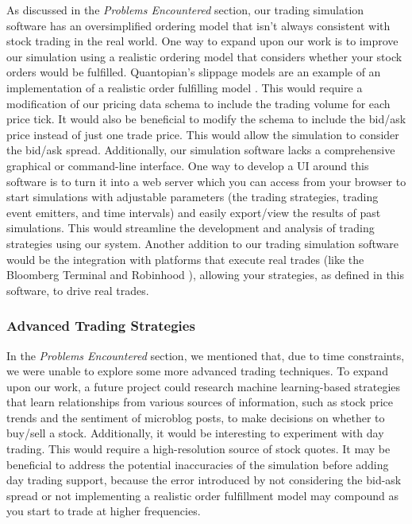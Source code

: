 As discussed in the \textit{Problems Encountered} section, our trading simulation software has an oversimplified ordering model that isn't always consistent with stock trading in the real world.
One way to expand upon our work is to improve our simulation using a realistic ordering model that considers whether your stock orders would be fulfilled.
Quantopian's slippage models are an example of an implementation of a realistic order fulfilling model \cite{quantopianSlippage}.
This would require a modification of our pricing data schema to include the trading volume for each price tick.
It would also be beneficial to modify the schema to include the bid/ask price instead of just one trade price.
This would allow the simulation to consider the bid/ask spread.
Additionally, our simulation software lacks a comprehensive graphical or command-line interface.
One way to develop a UI around this software is to turn it into a web server which you can access from your browser to start simulations with adjustable parameters (the trading strategies, trading event emitters, and time intervals) and easily export/view the results of past simulations.
This would streamline the development and analysis of trading strategies using our system.
Another addition to our trading simulation software would be the integration with platforms that execute real trades (like the Bloomberg Terminal \cite{terminal} and Robinhood \cite{robinhood}), allowing your strategies, as defined in this software, to drive real trades.

\subsubsection{Advanced Trading Strategies}

In the \textit{Problems Encountered} section, we mentioned that, due to time constraints, we were unable to explore some more advanced trading techniques.
To expand upon our work, a future project could research machine learning-based strategies that learn relationships from various sources of information, such as stock price trends and the sentiment of microblog posts, to make decisions on whether to buy/sell a stock.
Additionally, it would be interesting to experiment with day trading.
This would require a high-resolution source of stock quotes.
It may be beneficial to address the potential inaccuracies of the simulation before adding day trading support, because the error introduced by not considering the bid-ask spread or not implementing a realistic order fulfillment model may compound as you start to trade at higher frequencies.

